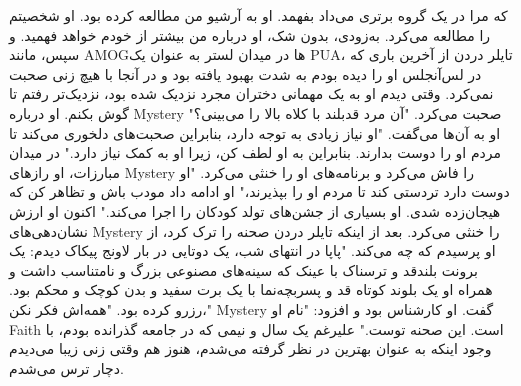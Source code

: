 که مرا در یک گروه برتری می‌داد بفهمد. او به آرشیو من مطالعه کرده بود. او شخصیتم را مطالعه می‌کرد. به‌زودی، بدون شک، او درباره من بیشتر از خودم خواهد فهمید. و سپس، مانند AMOG‌ها در میدان لستر
به عنوان یک PUA، تایلر دردن از آخرین باری که در لس‌آنجلس او را دیده بودم به شدت بهبود یافته بود و در آنجا با هیچ زنی صحبت نمی‌کرد. وقتی دیدم او به یک مهمانی دختران مجرد نزدیک شده بود، نزدیک‌تر رفتم تا گوش بکنم. او درباره Mystery صحبت می‌کرد.
"آن مرد قدبلند با کلاه بالا را می‌بینی؟" او به آن‌ها می‌گفت. "او نیاز زیادی به توجه دارد، بنابراین صحبت‌های دلخوری می‌کند تا مردم او را دوست بدارند. بنابراین به او لطف کن، زیرا او به کمک نیاز دارد."
در میدان مبارزات، او رازهای Mystery را فاش می‌کرد و برنامه‌های او را خنثی می‌کرد.
"او دوست دارد تردستی کند تا مردم او را بپذیرند،" او ادامه داد
مودب باش و تظاهر کن که هیجان‌زده شدی. او بسیاری از جشن‌های تولد کودکان را اجرا می‌کند."
اکنون او ارزش نشان‌دهی‌های Mystery را خنثی می‌کرد.
بعد از اینکه تایلر دردن صحنه را ترک کرد، از او پرسیدم که چه می‌کند. "پاپا
در انتهای شب، یک دوتایی در بار لاونج پیکاک دیدم: یک برونت بلندقد و ترسناک با عینک که سینه‌های مصنوعی بزرگ و نامتناسب داشت و همراه او یک بلوند کوتاه قد و پسربچه‌نما با یک برت سفید و بدن کوچک و محکم بود.
رزرو کرده بود.
"همه‌اش فکر نکن،" Mystery گفت. او کارشناس بود و افزود: "نام او Faith است. این صحنه توست."
علیرغم یک سال و نیمی که در جامعه گذرانده بودم، با وجود اینکه
به عنوان بهترین در نظر گرفته می‌شدم، هنوز هم وقتی زنی زیبا می‌دیدم دچار ترس می‌شدم.
